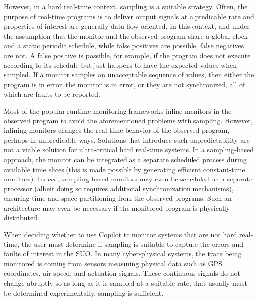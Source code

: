 However, in a hard real-time context, sampling is a suitable strategy.
%
 Often, the purpose of real-time programs is to deliver output signals at a
predicable rate and properties of interest are generally data-flow oriented.
%
 In this context, and under the assumption that the monitor and the observed
program share a global clock and a static periodic schedule, while false
positives are possible, false negatives are not.
%
 A false positive is possible, for example, if the program does not execute
according to its schedule but just happens to have the expected values when
sampled. 
%
 If a monitor samples an unacceptable sequence of values, then either the
program is in error, the monitor is in error, or they are not synchronized, all
of which are faults to be reported.
%

Most of the popular runtime monitoring frameworks inline monitors in the
observed program to avoid the aforementioned problems with sampling.
%
 However, inlining monitors changes the real-time behavior of the observed
program, perhaps in unpredicable ways.
%
Solutions that introduce such unpredictability are not a viable solution for
ultra-critical hard real-time systems.
%
 In a sampling-based approach, the monitor can be integrated as a separate
scheduled process during available time slices (this is made possible by
generating efficient constant-time monitors).
%
 Indeed, sampling-based monitors may even be scheduled on a separate processor
(albeit doing so requires additional synchronization mechanisms), ensuring time
and space partitioning from the observed programs.
%
 Such an architecture may even be necessary if the monitored program is
physically distributed.

When deciding whether to use Copilot to monitor systems that are not hard
real-time, the user must determine if sampling is suitable to capture the
errors and faults of interest in the  SUO. In many cyber-physical systems, the
trace being monitored is coming from sensors measuring physical data such as
GPS coordinates, air speed, and actuation signals.
%
 These continuous signals do not change abruptly so as long as it is sampled at
a suitable rate, that usually must be determined experimentally, sampling is
sufficient.



